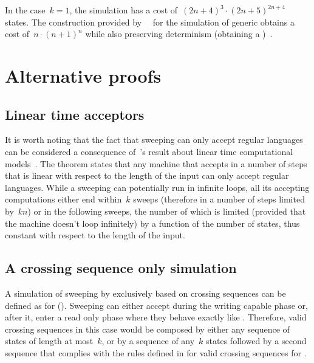 In the case~$k=1$, the simulation has a cost of~$(2n+4)^3\cdot(2n+5)^{2n+4}$ states.
The construction provided by~\citeauthor{PigPis14}~\cite{PigPis14} for the simulation of generic \ODLAs obtains a cost of~$n\cdot (n+1)^n$ while also preserving determinism (\ie obtaining a \ODFA)~\cite{PigPis14}.



\section{Alternative proofs}\label{sec:alt-proofs}


\subsection{Linear time acceptors}
It is worth noting that the fact that sweeping \kDLAs can only accept regular languages can be considered a consequence of~\citeauthor{Hen65}'s result about linear time computational models~\cite{Hen65}.
The theorem states that any machine that accepts in a number of steps that is linear with respect to the length of the input can only accept regular languages.
While a sweeping \kLA can potentially run in infinite loops, all its accepting computations either end within~$k$ sweeps (therefore in a number of steps limited by~$kn$) or in the following sweeps, the number of which is limited (provided that the machine doesn't loop infinitely) by a function of the number of states, thus constant with respect to the length of the input.


\subsection{A crossing sequence only simulation}
A simulation of sweeping \kDLAs by \ONFAs exclusively based on crossing sequences can be defined as for \TDFAs ().
Sweeping \kDLAs can either accept during the writing capable phase or, after it, enter a read only phase where they behave exactly like \TDFAs.
Therefore, valid crossing sequences in this case would be composed by either any sequence of states of length at most~$k$, or by a sequence of any~$k$ states followed by a second sequence that complies with the rules defined in  for valid crossing sequences for \TDFAs.

